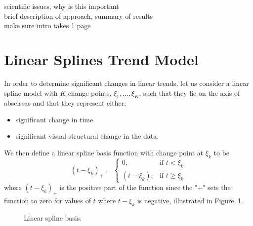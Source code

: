 \documentclass[12pt]{article}
\begin{document}
scientific issues, why is this important\\
brief description of approach, summary of results\\
make sure intro takes 1 page\\


\section{Linear Splines Trend Model}

In order to determine significant changes in linear trends, let us consider a linear spline model with $K$ change points, $\xi_1,\dots,\xi_K$, such that they lie on the axis of abscissas and that they represent either:
  \begin{itemize}
    \item significant change in time.
    \item significant visual structural change in the data.
  \end{itemize}
We then define a linear spline basis function with change point at $\xi_k$ to be
  \begin{equation*}
    (t-\xi_{k})_{+} =
      \begin{cases}
      0,           & \text{if $t < \xi_{k}$} \\
      (t-\xi_{k}), & \text{if $t \geq \xi_{k}$}
      \end{cases}
  \end{equation*}
where $(t-\xi_k)_{+}$ is the positive part of the function since the "$+$" sets the function to zero for values of $t$ where $t-\xi_{k}$ is negative, illustrated in Figure~\ref{spline}. 
\begin{figure}[!h]
  \centering
  \caption{Linear spline basis.} \label{spline}
\end{figure}
\end{document}
